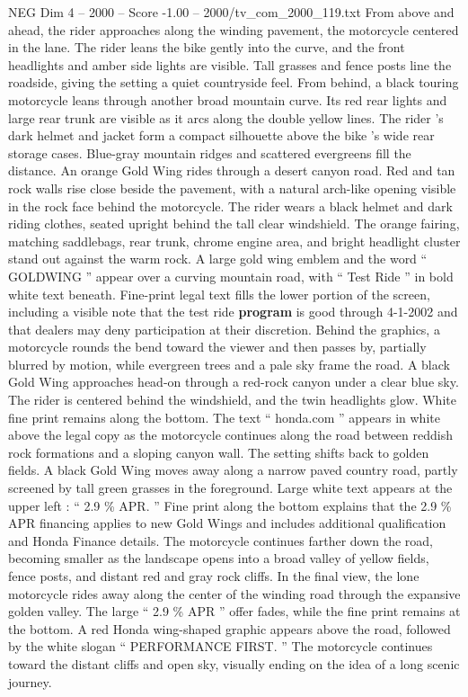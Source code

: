 \begin{textsample}{NEG Dim 4 – 2000 – Score -1.00 – 2000/tv\_com\_2000\_119.txt}
From above and ahead, the rider approaches along the winding pavement, the motorcycle centered in the lane.
The rider leans the bike gently into the curve, and the front headlights and amber side lights are visible.
Tall grasses and fence posts line the roadside, giving the setting a quiet countryside feel.
From behind, a black touring motorcycle leans through another broad mountain curve.
Its red rear lights and large rear trunk are visible as it arcs along the double yellow lines.
The rider ’s dark helmet and jacket form a compact silhouette above the bike ’s wide rear storage cases.
Blue-gray mountain ridges and scattered evergreens fill the distance.
An orange Gold Wing rides through a desert canyon road.
Red and tan rock walls rise close beside the pavement, with a natural arch-like opening visible in the rock face behind the motorcycle.
The rider wears a black helmet and dark riding clothes, seated upright behind the tall clear windshield.
The orange fairing, matching saddlebags, rear trunk, chrome engine area, and bright headlight cluster stand out against the warm rock.
A large gold wing emblem and the word “ GOLDWING ” appear over a curving mountain road, with “ Test Ride ” in bold white text beneath.
Fine-print legal text fills the lower portion of the screen, including a visible note that the test ride \textbf{program} is good through 4-1-2002 and that dealers may deny participation at their discretion.
Behind the graphics, a motorcycle rounds the bend toward the viewer and then passes by, partially blurred by motion, while evergreen trees and a pale sky frame the road.
A black Gold Wing approaches head-on through a red-rock canyon under a clear blue sky.
The rider is centered behind the windshield, and the twin headlights glow.
White fine print remains along the bottom.
The text “ honda.com ” appears in white above the legal copy as the motorcycle continues along the road between reddish rock formations and a sloping canyon wall.
The setting shifts back to golden fields.
A black Gold Wing moves away along a narrow paved country road, partly screened by tall green grasses in the foreground.
Large white text appears at the upper left : “ 2.9 \% APR. ” Fine print along the bottom explains that the 2.9 \% APR financing applies to new Gold Wings and includes additional qualification and Honda Finance details.
The motorcycle continues farther down the road, becoming smaller as the landscape opens into a broad valley of yellow fields, fence posts, and distant red and gray rock cliffs.
In the final view, the lone motorcycle rides away along the center of the winding road through the expansive golden valley.
The large “ 2.9 \% APR ” offer fades, while the fine print remains at the bottom.
A red Honda wing-shaped graphic appears above the road, followed by the white slogan “ PERFORMANCE FIRST. ” The motorcycle continues toward the distant cliffs and open sky, visually ending on the idea of a long scenic journey.

\end{textsample}
